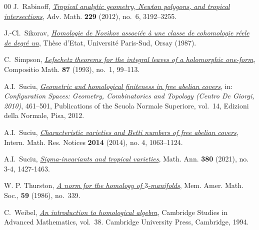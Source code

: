 \documentclass[11pt]{amsart}
\theoremstyle{definition}
\begin{document}
\begin{thebibliography}{00}
 J.~Rabinoff,
\href{https://doi.org/10.1016/j.aim.2012.02.003}%
{\em Tropical analytic geometry, Newton polygons, and 
tropical intersections}, Adv. Math. \textbf{229} (2012), 
no.~6, 3192--3255.

  J.-Cl.~Sikorav,
\href{http://perso.ens-lyon.fr/jean-claude.sikorav/textes/Novikov1987.pdf}%
{\em Homologie de {N}ovikov associ\'{e}e \`{a} une classe 
de cohomologie r\'{e}ele de degr\'{e} un}, Th\`{e}se d'Etat, 
Universit\'{e} Paris-Sud, Orsay (1987).

 C.~Simpson, 
\href{https://www.numdam.org/item/?id=CM_1993__87_1_99_0}%
{\em Lefschetz theorems for the integral leaves of a holomorphic one-form}, 
Compositio Math. \textbf{87} (1993), no.~1, 99--113.

 A.I.~Suciu,
\href{https://dx.doi.org/10.1007/978-88-7642-431-1_21}%
{\em Geometric and homological finiteness in free 
abelian covers}, in: {\em Configuration Spaces: Geometry, 
Combinatorics and Topology (Centro De Giorgi, 2010)}, 461--501, 
Publications of the Scuola Normale Superiore, vol.~14, 
Edizioni della Normale, Pisa, 2012. 

 A.I.~Suciu,
\href{http://dx.doi.org/10.1093/imrn/rns246}%
{\em Characteristic varieties and Betti numbers of free
abelian covers}, Intern. Math. Res. Notices \textbf{2014} 
(2014), no. 4, 1063--1124.

 A.I.~Suciu,
\href{https://doi.org/10.1007/s00208-021-02172-z}%
{\em Sigma-invariants and tropical varieties},
Math. Ann. \textbf{380} (2021), no. 3-4, 1427-1463.

 W. P. Thurston,
\href{https://dx.doi.orgs/10.1090/memo/0339}%
{\em A norm for the homology of $3$-manifolds},
Mem. Amer. Math. Soc., \textbf{59} (1986), no.~339.

  C.~Weibel,
\href{http://dx.doi.org/10.1017/CBO9781139644136}%
{\em An introduction to homological algebra}, 
Cambridge Studies in Advanced Mathematics, vol.~38. 
Cambridge University Press, Cambridge, 1994.

\end{thebibliography}
\end{document}
